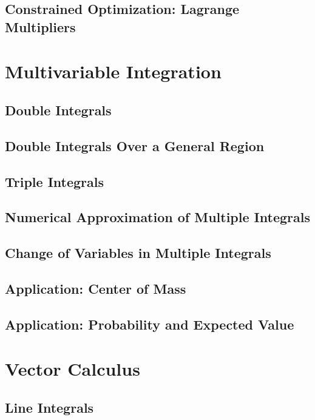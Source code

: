 \documentclass[symmetric,justified,marginals=justified,notoc]{tufte-book}
\theoremstyle{mytheoremstyle}
\begin{document}
	\section{Constrained Optimization: Lagrange Multipliers}
	
	

\chapter{Multivariable Integration}

	\section{Double Integrals}
	
	\section{Double Integrals Over a General Region}
	
	\section{Triple Integrals}
	
	\section{Numerical Approximation of Multiple Integrals}
	
	\section{Change of Variables in Multiple Integrals}
	
	\section{Application: Center of Mass}
	
	\section{Application: Probability and Expected Value}
	
	
\chapter{Vector Calculus}

	\section{Line Integrals}
	
\end{document}
